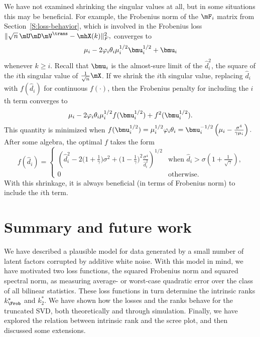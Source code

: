 We have not examined shrinking the singular values at all, but in some 
situations this may be beneficial.  For example, the Frobenius norm of the $\mF_i$ matrix from Section~\ref{S:loss-behavior}, which is involved in the Frobenius loss
\(
    \| \sqrt{n} \, \mU \mD \mV^\trans - \mhX(k) \|_F^2,
\)
converges to
\[
    \mu_i - 2 \varphi_i \theta_i \mu_i^{1/2} \bmu_i^{1/2} + \bmu_i
\]
whenever $k \geq i$.  Recall that $\bmu_i$ is the almost-sure limit of
the $\hat d_i^2$, the square of the $i$th singular value of $\frac{1}{\sqrt{n}} \mX$.  If we shrink the $i$th singular value, replacing
$\hat d_i$ with $f(\hat d_i)$ for continuous $f(\cdot)$, then the Frobenius penalty for including the $i$th term converges to
\[
    \mu_i 
    - 2 \varphi_i \theta_i \mu_i^{1/2} f( \bmu_i^{1/2} ) 
    + f^2( \bmu_i^{1/2} ).
\]
This quantity is minimized when
\(
    f( \bmu_i^{1/2}) 
        = \mu_i^{1/2} \varphi_i \theta_i
        = \bmu_i^{-1/2} 
          \left( \mu_i - \frac{\sigma^4}{ \gamma \mu_i } \right).               
\)
After some algebra, the optimal $f$ takes the form
\begin{equation}
    f( \hat d_i )
        =
        \begin{cases}
        \left(
            \hat d_i^2
            -
            2
            \big(
                1 + \frac{1}{\gamma}
            \big)
            \sigma^2
            +
            \big(
                1 - \frac{1}{\gamma}
            \big)^2
            \frac{\sigma^4}
                 {\hat d_i^2}
        \right)^{1/2}
            &\text{when $\hat d_i 
                         > 
                         \sigma 
                         \left(
                            1 + \frac{1}{\sqrt{\gamma}}
                         \right)$,} \\
        0 
            &\text{otherwise.}
        \end{cases}
\end{equation}
With this shrinkage, it is always beneficial (in terms of Frobenius norm) to include the $i$th term.

\section{Summary and future work}\label{S:intrinsic-rank-summary}

We have described a plausible model for data generated by a small number of
latent factors corrupted by additive white noise. With this model in mind, we
have motivated two loss functions, the squared Frobenius norm and squared
spectral norm, as measuring average- or worst-case quadratic error over the
class of all bilinear statistics. These loss functions in turn determine the
intrinsic ranks $k_\Frob^\ast$ and $k_2^\ast$. We have shown how the losses
and the ranks behave for the truncated SVD, both theoretically and through
simulation. Finally, we have explored the relation between intrinsic rank and
the scree plot, and then discussed some extensions.

